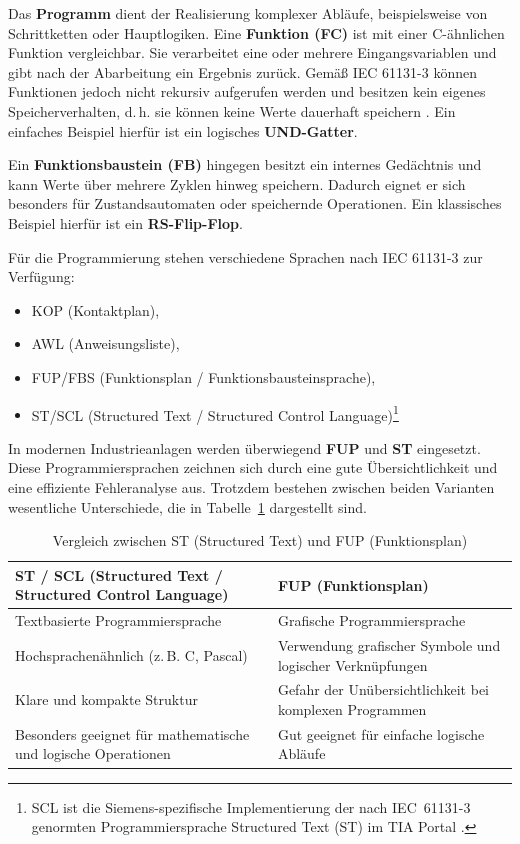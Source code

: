 Das \textbf{Programm} dient der Realisierung komplexer Abläufe, beispielsweise von Schrittketten oder Hauptlogiken.  
Eine \textbf{Funktion (FC)} ist mit einer C-ähnlichen Funktion vergleichbar. Sie verarbeitet eine oder mehrere Eingangsvariablen und gibt nach der Abarbeitung ein Ergebnis zurück.  
Gemäß IEC 61131-3 können Funktionen jedoch nicht rekursiv aufgerufen werden und besitzen kein eigenes Speicherverhalten, d.\,h. sie können keine Werte dauerhaft speichern \cite{Seitz.2021}.  
Ein einfaches Beispiel hierfür ist ein logisches \textbf{UND-Gatter}.

Ein \textbf{Funktionsbaustein (FB)} hingegen besitzt ein internes Gedächtnis und kann Werte über mehrere Zyklen hinweg speichern. Dadurch eignet er sich besonders für Zustandsautomaten oder speichernde Operationen.  
Ein klassisches Beispiel hierfür ist ein \textbf{RS-Flip-Flop}.

Für die Programmierung stehen verschiedene Sprachen nach IEC 61131-3 \cite{IEC6113-3_2022} zur Verfügung:
\begin{itemize}
	\item KOP (Kontaktplan),
	\item AWL (Anweisungsliste),
	\item FUP/FBS (Funktionsplan / Funktionsbausteinsprache),
	\item ST/SCL (Structured Text / Structured Control Language)\footnote{SCL ist die Siemens-spezifische Implementierung der nach IEC~61131-3 genormten Programmiersprache Structured Text (ST) im TIA Portal \cite{Kanngießer}.}
\end{itemize}

In modernen Industrieanlagen werden überwiegend \textbf{FUP} und \textbf{ST} eingesetzt. Diese Programmiersprachen zeichnen sich durch eine gute Übersichtlichkeit und eine effiziente Fehleranalyse aus.  
Trotzdem bestehen zwischen beiden Varianten wesentliche Unterschiede, die in Tabelle~\ref{tab:vergleich_fup_st} dargestellt sind.

\begin{table}[H]
	\centering
	\begin{tabular}{|p{7cm}|p{7cm}|}
		\hline
		\textbf{ST / SCL (Structured Text / Structured Control Language)} & \textbf{FUP (Funktionsplan)}\\
		\hline
		Textbasierte Programmiersprache & Grafische Programmiersprache\\
		\hline
		Hochsprachenähnlich (z.\,B. C, Pascal) & Verwendung grafischer Symbole und logischer Verknüpfungen\\
		\hline
		Klare und kompakte Struktur & Gefahr der Unübersichtlichkeit bei komplexen Programmen\\
		\hline
		Besonders geeignet für mathematische und logische Operationen & Gut geeignet für einfache logische Abläufe\\
		\hline
	\end{tabular}
	\caption{Vergleich zwischen ST (Structured Text) und FUP (Funktionsplan) \cite{siemens_programmieren}}
	\label{tab:vergleich_fup_st}
\end{table}

